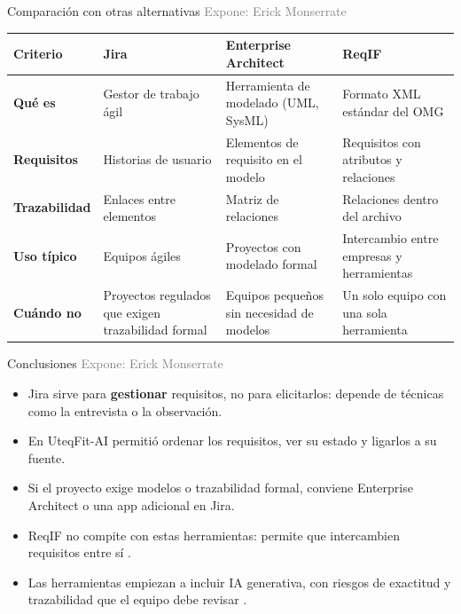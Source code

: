 \documentclass[aspectratio=169,11pt]{beamer}
\newcommand{\expone}[1]{\hfill{\scriptsize\textcolor{gray}{Expone: #1}}}
\begin{document}
\begin{frame}{Comparación con otras alternativas}
  \expone{Erick Monserrate}
  \footnotesize
  \renewcommand{\arraystretch}{1.25}
  \begin{tabularx}{\textwidth}{>{\bfseries}p{2.2cm} L L L}
    \toprule
    Criterio & Jira & Enterprise Architect & ReqIF \\
    \midrule
    Qué es        & Gestor de trabajo ágil
                  & Herramienta de modelado (UML, SysML)
                  & Formato XML estándar del OMG \cite{omgreqif} \\
    Requisitos    & Historias de usuario
                  & Elementos de requisito en el modelo
                  & Requisitos con atributos y relaciones \\
    Trazabilidad  & Enlaces entre elementos
                  & Matriz de relaciones \cite{sparxmatrix}
                  & Relaciones dentro del archivo \\
    Uso típico    & Equipos ágiles
                  & Proyectos con modelado formal
                  & Intercambio entre empresas y herramientas \cite{ebert2012} \\
    Cuándo no     & Proyectos regulados que exigen trazabilidad formal
                  & Equipos pequeños sin necesidad de modelos
                  & Un solo equipo con una sola herramienta \\
    \bottomrule
  \end{tabularx}
\end{frame}

\begin{frame}{Conclusiones}
  \expone{Erick Monserrate}
  \begin{itemize}
    \item Jira sirve para \textbf{gestionar} requisitos, no para elicitarlos:
          depende de técnicas como la entrevista o la observación.
    \item En UteqFit-AI permitió ordenar los requisitos, ver su estado y
          ligarlos a su fuente.
    \item Si el proyecto exige modelos o trazabilidad formal, conviene
          Enterprise Architect o una app adicional en Jira.
    \item ReqIF no compite con estas herramientas: permite que intercambien
          requisitos entre sí \cite{omgreqif}.
    \item Las herramientas empiezan a incluir IA generativa, con riesgos de
          exactitud y trazabilidad que el equipo debe revisar \cite{cheng2026}.
  \end{itemize}
\end{frame}
\end{document}
